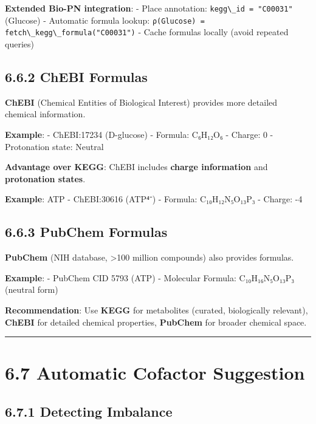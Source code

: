 \textbf{Extended Bio-PN integration}: - Place annotation:
\passthrough{\lstinline!kegg\_id = "C00031"!} (Glucose) - Automatic
formula lookup:
\passthrough{\lstinline!ρ(Glucose) = fetch\_kegg\_formula("C00031")!} -
Cache formulas locally (avoid repeated queries)

\hypertarget{chebi-formulas}{%
\subsection{6.6.2 ChEBI Formulas}\label{chebi-formulas}}

\textbf{ChEBI} (Chemical Entities of Biological Interest) provides more
detailed chemical information.

\textbf{Example}: - ChEBI:17234 (D-glucose) - Formula: C₆H₁₂O₆ - Charge:
0 - Protonation state: Neutral

\textbf{Advantage over KEGG}: ChEBI includes \textbf{charge information}
and \textbf{protonation states}.

\textbf{Example}: ATP - ChEBI:30616 (ATP⁴⁻) - Formula: C₁₀H₁₂N₅O₁₃P₃ -
Charge: -4

\hypertarget{pubchem-formulas}{%
\subsection{6.6.3 PubChem Formulas}\label{pubchem-formulas}}

\textbf{PubChem} (NIH database, \textgreater100 million compounds) also
provides formulas.

\textbf{Example}: - PubChem CID 5793 (ATP) - Molecular Formula:
C₁₀H₁₆N₅O₁₃P₃ (neutral form)

\textbf{Recommendation}: Use \textbf{KEGG} for metabolites (curated,
biologically relevant), \textbf{ChEBI} for detailed chemical properties,
\textbf{PubChem} for broader chemical space.

\begin{center}\rule{0.5\linewidth}{0.5pt}\end{center}

\hypertarget{automatic-cofactor-suggestion}{%
\section{6.7 Automatic Cofactor
Suggestion}\label{automatic-cofactor-suggestion}}

\hypertarget{detecting-imbalance}{%
\subsection{6.7.1 Detecting Imbalance}\label{detecting-imbalance}}

